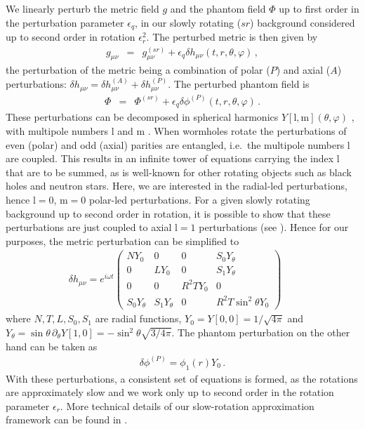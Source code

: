 \documentclass[twocolumn,showpacs,preprintnumbers,amsmath,amssymb,floatfix]{revtex4-1}
\begin{document}
%
We linearly perturb the metric field $g$ and the phantom field $\Phi$ up to first order in the perturbation parameter $\epsilon_q$, in our slowly rotating ($sr$) background considered up to second order in rotation $\epsilon_r^2$.
The perturbed metric is then given by
\begin{eqnarray}
g_{\mu\nu} &=& g^{(sr)}_{\mu\nu} + \epsilon_q \delta h_{\mu\nu}(t,r,\theta,{\varphi}) \, , 
\end{eqnarray}
%
%
the perturbation of the metric being a combination of polar ($P$) and axial ($A$) perturbations:
$ \delta h_{\mu\nu}=\delta h^{(A)}_{\mu\nu} + \delta h^{(P)}_{\mu\nu}$.
The perturbed phantom field is
\begin{eqnarray}
\Phi &=& {\Phi}^{(sr)} + \epsilon_q \delta{\phi}^{(P)} (t,r,\theta,{\varphi})
%
\, .
\end{eqnarray}
These perturbations can be decomposed in spherical harmonics 
$Y[\mathrm{l},\mathrm{m}](\theta,{\varphi})$ , 
with multipole numbers $\mathrm{l}$ and $\mathrm{m}$  \cite{Blazquez-Salcedo:2022eik}.
When wormholes rotate the perturbations of even (polar) and odd (axial) parities are entangled, i.e.~the multipole numbers $\mathrm{l}$ are coupled.
This results in an infinite tower of equations carrying the index $\mathrm{l}$ that are to be summed, as is well-known for other rotating objects such as black holes and neutron stars.
%
Here, we are interested in the radial-led perturbations, hence $\mathrm{l}=0$, $\mathrm{m}=0$ polar-led perturbations. 
For a given slowly rotating background up to second order in rotation, it is possible to show that these perturbations are just coupled to axial $\mathrm{l}=1$ perturbations ({see} \cite{Blazquez-Salcedo:2022eik}). Hence for our purposes, the metric perturbation can be simplified {to}
\begin{eqnarray}
\delta h_{\mu\nu}= e^{i\omega t}
    \begin{pmatrix}
NY_0 & 0    & 0 & {S}_0 Y_\theta \\
0   & LY_0 & 0 & {S}_1 Y_\theta \\
0 & 0 & R^2 TY_0 & 0 \\
{S}_0 Y_\theta & {S}_1 Y_\theta & 0 & R^2 T\sin^2{\theta}Y_0
\end{pmatrix} \, \, \, \, \, \, \, \, \,
\end{eqnarray}
%
%
%
%
where 
$N, T, L, {S}_0, {S}_1$ are radial functions, 
$Y_0=Y[0,0]
=1/\sqrt{4\pi}$ 
and 
$Y_\theta=\sin{\theta} \, \partial_\theta Y[1,0]
=-\sin^2{\theta}\sqrt{3/4\pi}$. 
The phantom perturbation on the other hand can be taken as
\begin{eqnarray}
 \delta{\phi}^{(P)} = 
 {\phi_1(r)} Y_0 \, .
\end{eqnarray}
%
%
With these perturbations, a consistent set of equations is formed, as the rotations are approximately slow and we {work} only up to second order in the rotation parameter $\epsilon_r$. More technical details of our slow-rotation approximation framework can be found in \cite{Blazquez-Salcedo:2022eik}.
\end{document}
